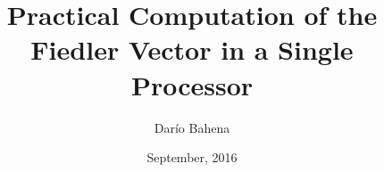 \documentclass[unknownkeysallowed]{beamer}
\title{Practical Computation of the Fiedler Vector in a Single Processor}
\author{Darío Bahena}
\institute{CINVESTAV}
\date{September, 2016}
\begin{document}
	\begin{frame}[plain]
	  \titlepage
	\end{frame}
  
  
  
  
  
  
  
  
    
  
  
    
  
  
    
\end{document}
